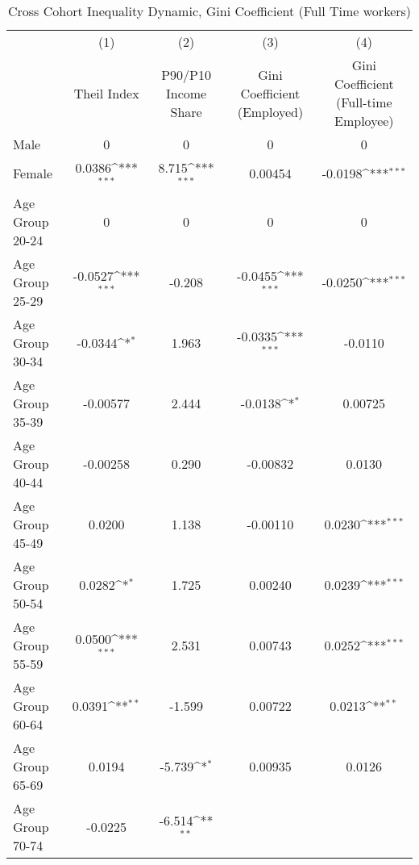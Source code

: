 \begin{table}[htbp]\centering
\def\sym#1{\ifmmode^{#1}\else\(^{#1}\)\fi}
\caption{Cross Cohort Inequality Dynamic, Gini Coefficient (Full Time workers)\label{reg2}}
\begin{tabular}{l*{4}{c}}
\hline\hline
                    &\multicolumn{1}{c}{(1)}&\multicolumn{1}{c}{(2)}&\multicolumn{1}{c}{(3)}&\multicolumn{1}{c}{(4)}\\
                    &\multicolumn{1}{c}{Theil Index}&\multicolumn{1}{c}{P90/P10 Income Share}&\multicolumn{1}{c}{Gini Coefficient (Employed)}&\multicolumn{1}{c}{Gini Coefficient (Full-time Employee)}\\
\hline
Male                &           0         &           0         &           0         &           0         \\
Female              &      0.0386\sym{***}&       8.715\sym{***}&     0.00454         &     -0.0198\sym{***}\\
Age Group 20-24     &           0         &           0         &           0         &           0         \\
Age Group 25-29     &     -0.0527\sym{***}&      -0.208         &     -0.0455\sym{***}&     -0.0250\sym{***}\\
Age Group 30-34     &     -0.0344\sym{*}  &       1.963         &     -0.0335\sym{***}&     -0.0110         \\
Age Group 35-39     &    -0.00577         &       2.444         &     -0.0138\sym{*}  &     0.00725         \\
Age Group 40-44     &    -0.00258         &       0.290         &    -0.00832         &      0.0130         \\
Age Group 45-49     &      0.0200         &       1.138         &    -0.00110         &      0.0230\sym{***}\\
Age Group 50-54     &      0.0282\sym{*}  &       1.725         &     0.00240         &      0.0239\sym{***}\\
Age Group 55-59     &      0.0500\sym{***}&       2.531         &     0.00743         &      0.0252\sym{***}\\
Age Group 60-64     &      0.0391\sym{**} &      -1.599         &     0.00722         &      0.0213\sym{**} \\
Age Group 65-69     &      0.0194         &      -5.739\sym{*}  &     0.00935         &      0.0126         \\
Age Group 70-74     &     -0.0225         &      -6.514\sym{**} &                     &                     \\

\end{tabular}
\end{table}
